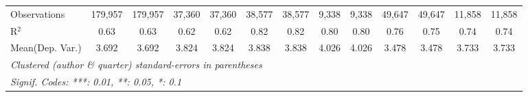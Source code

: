 \begin{tabular}{lcccccccccccc}
   Observations                             & 179,957       & 179,957       & 37,360        & 37,360       & 38,577       & 38,577      & 9,338   & 9,338   & 49,647      & 49,647  & 11,858       & 11,858\\  
   R$^2$                                    & 0.63          & 0.63          & 0.62          & 0.62         & 0.82         & 0.82        & 0.80    & 0.80    & 0.76        & 0.75    & 0.74         & 0.74\\  
Mean(Dep. Var.) & 3.692 & 3.692 & 3.824 & 3.824 & 3.838 & 3.838 & 4.026 & 4.026 & 3.478 & 3.478 & 3.733 & 3.733 \\
   \midrule \midrule
   \multicolumn{13}{l}{\emph{Clustered (author \& quarter) standard-errors in parentheses}}\\
   \multicolumn{13}{l}{\emph{Signif. Codes: ***: 0.01, **: 0.05, *: 0.1}}\\
\end{tabular}
\par\endgroup
